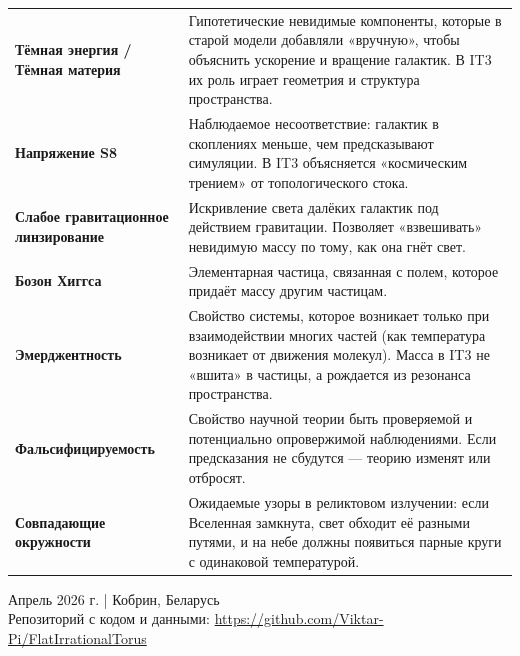 \documentclass[12pt,a4paper,oneside]{book}
\begin{document}
\begin{longtable}{>{\bfseries}p{3.5cm}p{11cm}}
\textbf{Тёмная энергия / Тёмная материя} & Гипотетические невидимые компоненты, которые в старой модели добавляли «вручную», чтобы объяснить ускорение и вращение галактик. В IT3 их роль играет геометрия и структура пространства. \\
\textbf{Напряжение S8} & Наблюдаемое несоответствие: галактик в скоплениях меньше, чем предсказывают симуляции. В IT3 объясняется «космическим трением» от топологического стока. \\
\textbf{Слабое гравитационное линзирование} & Искривление света далёких галактик под действием гравитации. Позволяет «взвешивать» невидимую массу по тому, как она гнёт свет. \\
\textbf{Бозон Хиггса} & Элементарная частица, связанная с полем, которое придаёт массу другим частицам. \\
\textbf{Эмерджентность} & Свойство системы, которое возникает только при взаимодействии многих частей (как температура возникает от движения молекул). Масса в IT3 не «вшита» в частицы, а рождается из резонанса пространства. \\
\textbf{Фальсифицируемость} & Свойство научной теории быть проверяемой и потенциально опровержимой наблюдениями. Если предсказания не сбудутся — теорию изменят или отбросят. \\
\textbf{Совпадающие окружности} & Ожидаемые узоры в реликтовом излучении: если Вселенная замкнута, свет обходит её разными путями, и на небе должны появиться парные круги с одинаковой температурой. \\
\end{longtable}

\vspace{2cm}
\begin{flushright}
\small Апрель 2026 г. | Кобрин, Беларусь\\
\small Репозиторий с кодом и данными: \url{https://github.com/Viktar-Pi/FlatIrrationalTorus}
\end{flushright}

\end{document}
